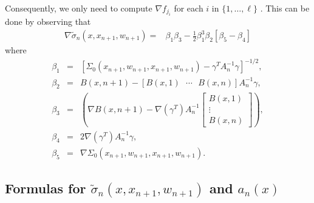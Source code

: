 \documentclass{article}
\newcommand{\w}{w}
\newcommand{\sigmatilde}{\tilde{\sigma}}
\begin{document}
Consequently, we only need to compute $\nabla f_{j_{i}}$ for each $i$ in $\{1,\ldots,\ell\}$ . This can be done by observing that
\begin{align*}
\nabla\tilde{\sigma}_{n}\left(x,x_{n+1},\w_{n+1}\right) =&
\beta_{1} \beta_{3}-\frac{1}{2}\beta_{1}^{3}\beta_{2}\left[\beta_{5}-\beta_{4}\right] 
\end{align*}
where 
\begin{eqnarray*}
\beta_{1} & = & \left[\Sigma_{0}\left(x_{n+1},\w_{n+1},x_{n+1},\w_{n+1}\right)-\gamma^{T}A_{n}^{-1}\gamma\right]^{-1/2},\\
\beta_{2} & = & B\left(x,n+1\right)-\left[B\left(x,1\right)\mbox{ }\cdots\mbox{ }B\left(x,n\right)\right]A_{n}^{-1}\gamma,\\
\beta_{3} & = & \left(\nabla B\left(x,n+1\right)-\nabla\left(\gamma^{T}\right)A_{n}^{-1}\left[\begin{array}{c} B\left(x,1\right)\\
				\vdots\\
				B\left(x,n\right)\end{array}\right]\right),\\
\beta_{4} & = & 2\nabla\left(\gamma^{T}\right)A_{n}^{-1}\gamma,\\
\beta_{5} & = & \nabla\Sigma_{0}\left(x_{n+1},\w_{n+1},x_{n+1},\w_{n+1}\right).
\end{eqnarray*}

\subsection{Formulas for $\sigmatilde_{n}\left(x,x_{n+1},\w_{n+1}\right)$
and $a_{n}\left(x\right)$ }
\end{document}
